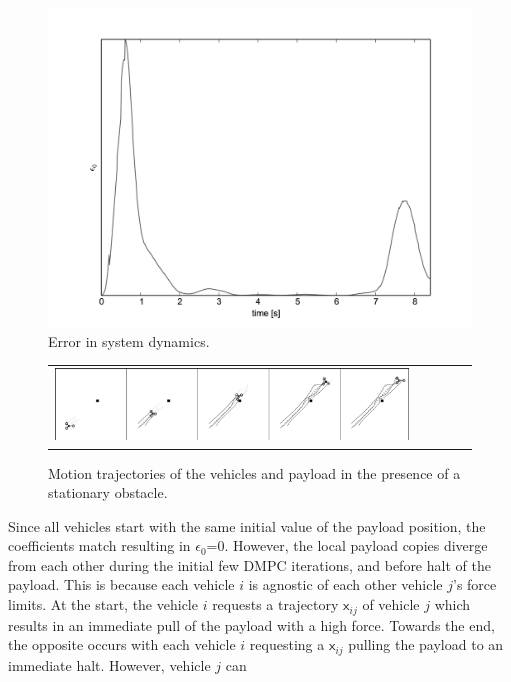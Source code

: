 \documentclass[letterpaper, 10 pt, conference]{ieeeconf}
\newcommand{\cx}{\textsf{x}}
\begin{document}
\begin{figure}[H]
	\centering
	\includegraphics[scale=0.40]{figures/epsilon.pdf}
	\caption{Error in system dynamics.}
	\label{error}
\end{figure}
\indent
\begin{figure}[h]
	\centering
	\setlength{\tabcolsep}{0.1em}
	\begin{tabular}[t]{rrrrr}
		\includegraphics[scale=0.80]{figures/obstacle.pdf}
	\end{tabular}
	\caption{Motion trajectories of the vehicles and payload in the presence of a stationary obstacle.}
	\label{obstacle}
\end{figure}
Since all vehicles start with the same initial value of the payload position, the coefficients match resulting in $\epsilon_0$=0. However, the local payload copies diverge from each other during the initial few DMPC iterations, and before halt of the payload. This is because each vehicle $i$ is agnostic of each other vehicle $j$'s force limits. At the start, the vehicle $i$ requests a trajectory $\cx_{ij}$ of vehicle $j$ which results in an immediate pull of the payload with a high force. Towards the end, the opposite occurs with each vehicle $i$ requesting a $\cx_{ij}$ pulling the payload to an immediate halt. However, vehicle $j$ can
\end{document}
